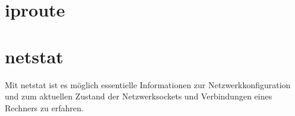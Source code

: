 \section{iproute}
\label{sec:netz-werkzeuge-iproute}
\begin{abstractsec}
\end{abstractsec}
\begin{normaltext}
\end{normaltext}

\section{netstat}
\label{sec:netz-werkzeuge-netstat}
\begin{abstractsec}
  Mit netstat ist es möglich essentielle Informationen zur
  Netzwerkkonfiguration und zum aktuellen Zustand der Netzwerksockets und
  Verbindungen eines Rechners zu erfahren.
\end{abstractsec}
